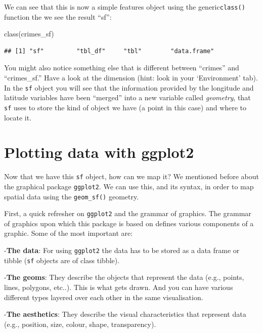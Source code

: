 \documentclass[
]{book}
\newenvironment{Shaded}{\begin{snugshade}}{\end{snugshade}}
\newcommand{\FunctionTok}[1]{\textcolor[rgb]{0.00,0.00,0.00}{#1}}
\newcommand{\NormalTok}[1]{#1}
\begin{document}
We can see that this is now a simple features object using the generic\texttt{class()} function the we see the result ``sf'':

\begin{Shaded}
\begin{Highlighting}[]
\FunctionTok{class}\NormalTok{(crimes\_sf)}
\end{Highlighting}
\end{Shaded}

\begin{verbatim}
## [1] "sf"         "tbl_df"     "tbl"        "data.frame"
\end{verbatim}

You might also notice something else that is different between ``crimes'' and ``crimes\_sf.'' Have a look at the dimension (hint: look in your `Environment' tab). In the \texttt{sf} object you will see that the information provided by the longitude and latitude variables have been ``merged'' into a new variable called \emph{geometry}, that \texttt{sf} uses to store the kind of object we have (a point in this case) and where to locate it.

\hypertarget{plotting-data-with-ggplot2}{%
\section{Plotting data with ggplot2}\label{plotting-data-with-ggplot2}}

Now that we have this \texttt{sf} object, how can we map it? We mentioned before about the graphical package \texttt{ggplot2}. We can use this, and its syntax, in order to map spatial data using the \texttt{geom\_sf()} geometry.

First, a quick refresher on \texttt{ggplot2} and the grammar of graphics. The grammar of graphics upon which this package is based on defines various components of a graphic. Some of the most important are:

-\textbf{The data}: For using \texttt{ggplot2} the data has to be stored as a data frame or tibble (\texttt{sf} objects are of class tibble).

-\textbf{The geoms}: They describe the objects that represent the data (e.g., points, lines, polygons, etc..). This is what gets drawn. And you can have various different types layered over each other in the same visualisation.

-\textbf{The aesthetics}: They describe the visual characteristics that represent data (e.g., position, size, colour, shape, transparency).
\end{document}

